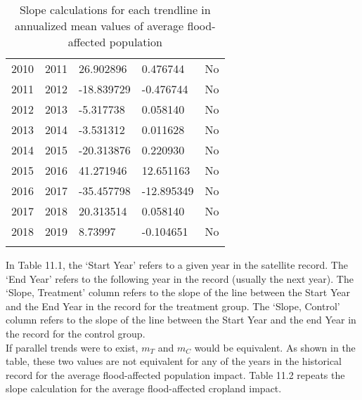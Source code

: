 \begin{longtable}{|p{1.2cm}|p{1.2cm}|p{2.2cm}|p{2cm}|p{1.5cm}|}
2010\rule{0pt}{4ex} & 2011 & 26.902896 & 0.476744 & No\\
2011\rule{0pt}{4ex} & 2012 & -18.839729 & -0.476744 & No\\
2012\rule{0pt}{4ex} & 2013 & -5.317738 & 0.058140 & No\\
2013\rule{0pt}{4ex} & 2014 & -3.531312 & 0.011628 & No\\
2014\rule{0pt}{4ex} & 2015 & -20.313876 & 0.220930 & No\\
2015\rule{0pt}{4ex} & 2016 & 41.271946 & 12.651163 & No\\
2016\rule{0pt}{4ex} & 2017 & -35.457798 & -12.895349 & No\\
2017\rule{0pt}{4ex} & 2018 & 20.313514 & 0.058140 & No\\
2018\rule{0pt}{4ex} & 2019 & 8.73997 & -0.104651 & No\\
\hline
\caption{Slope calculations for each trendline in annualized mean values of average flood-affected population}
\end{longtable}

In Table 11.1, the ‘Start Year’ refers to a given year in the satellite record. The ‘End Year’ refers to the following year in the record (usually the next year). The ‘Slope, Treatment’ column refers to the slope of the line between the Start Year and the End Year in the record for the treatment group. The ‘Slope, Control’ column refers to the slope of the line between the Start Year and the end Year in the record for the control group.\\

If parallel trends were to exist, \({m_T}\) and \({m_C}\) would be equivalent. As shown in the table, these two values are not equivalent for any of the years in the historical record for the average flood-affected population impact. Table 11.2 repeats the slope calculation for the average flood-affected cropland impact.\\

